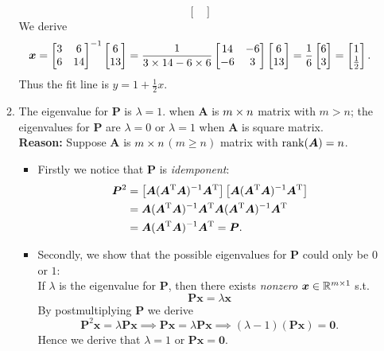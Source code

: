 \begin{enumerate}
\begin{enumerate}
\[\begin{bmatrix}
\end{bmatrix}
\]
We derive 
\[\bm x=\begin{bmatrix}
3&6\\6&14
\end{bmatrix}^{-1}\begin{bmatrix}
6\\13
\end{bmatrix}
=\frac{1}{3\times14-6\times6}\begin{bmatrix}
14&-6\\-6&3
\end{bmatrix}\begin{bmatrix}
6\\13
\end{bmatrix}=\frac{1}{6}\begin{bmatrix}
6\\3
\end{bmatrix}=\begin{bmatrix}
1\\\frac{1}{2}
\end{bmatrix}.\]
Thus the fit line is $y=1+\frac{1}{2}x.$
\item
The eigenvalue for $\bm P$ is $\lambda=1.$ when $\bm A$ is $m\times n$ matrix with $m>n$; the eigenvalues for $\bm P$ are $\lambda=0$ or $\lambda=1$ when $\bm A$ is square matrix.
\\
\textbf{Reason: }Suppose $\bm A$ is $m\times n$$(m\ge n)$ matrix with $\operatorname{rank}(\bm A)=n$.\\
\begin{itemize}
\item
Firstly we notice that $\bm P$ is \textit{idemponent}:
\[
\begin{aligned}
\bm P^2&=\left[\bm A(\bm A^{\mathrm T}\bm A)^{-1}\bm A^{\mathrm T}\right]\left[\bm A(\bm A^{\mathrm T}\bm A)^{-1}\bm A^{\mathrm T}\right]\\
&=\bm A(\bm A^{\mathrm T}\bm A)^{-1}\bm A^{\mathrm T}\bm A(\bm A^{\mathrm T}\bm A)^{-1}\bm A^{\mathrm T}\\
&=\bm A(\bm A^{\mathrm T}\bm A)^{-1}\bm A^{\mathrm T}=\bm P.
\end{aligned}
\]
\item
Secondly, we show that the possible eigenvalues for $\bm P$ could only be $0$ or $1$:\\
If $\lambda$ is the eigenvalue for $\bm P$, then there exists \emph{nonzero} $\bm x\in\mathbb{R}^{m\times 1}$ s.t.
\[
\bm{Px}=\lambda\bm x
\]
By postmultiplying $\bm P$ we derive
\[
\bm P^2\bm x=\lambda\bm P\bm x
\implies
\bm P\bm x=\lambda\bm P\bm x
\implies
(\lambda-1)(\bm{Px})=\bm0.
\]
Hence we derive that $\lambda=1$ or $\bm{Px}=\bm0.$\\

\end{itemize}$$
\end{enumerate}
\end{enumerate}
